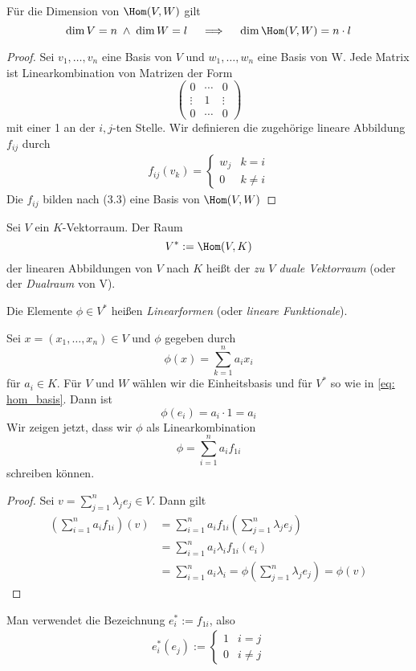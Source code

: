 \documentclass{mycourse}
\begin{document}
Für die Dimension von $\Hom(V,W)$ gilt
\[
	\dim V=n \;\land\; \dim W=l \quad \implies\quad \dim \Hom(V,W)=n\cdot l
\]
\begin{proof}
Sei $v_1,\dotsc,v_n$ eine Basis von $V$ und $w_1,\dotsc,w_n$ eine Basis von W.
Jede Matrix ist Linearkombination von Matrizen der Form 
\[
	\begin{pmatrix}0&\cdots&0\\\vdots&1&\vdots\\0&\cdots&0\end{pmatrix}
\]
mit einer 1 an der $i,j$-ten Stelle.
Wir definieren die zugehörige lineare Abbildung $f_{ij}$ durch
\begin{align}
\label{eq: hom_basis}
f_{ij}(v_k)=\begin{cases}
w_j & k=i\\
0 & k\neq i
\end{cases}
\end{align}
Die $f_{ij}$ bilden nach (3.3) eine Basis von $\Hom(V,W)$
\end{proof}

\begin{df}
\label{df:9.1}
Sei $V$ ein $K$-Vektorraum.
Der Raum 
\[
	V^*:=\Hom(V,K)
\]
der linearen Abbildungen von $V$ nach $K$ heißt der \emph{zu $V$ duale Vektorraum} (oder der \emph{Dualraum} von V).

Die Elemente $\phi\in V^*$ heißen \emph{Linearformen} (oder \emph{lineare Funktionale}).
\begin{ex}
	Sei $x=(x_1,\dotsc,x_n)\in V$ und $\phi$ gegeben durch
	\[
		\phi(x) = \sum_{k=1}^n a_ix_i
	\]
	für $a_i \in K$.
	Für $V$ und $W$ wählen wir die Einheitsbasis und für $V^*$ so wie in \eqref{eq: hom_basis}.
	Dann ist
	\[
	\phi(e_i)=a_i\cdot1=a_i
	\]
Wir zeigen jetzt, dass wir $\phi$ als Linearkombination
\[
	\phi=\sum_{i=1}^na_if_{1i}
\]
schreiben können.
\begin{proof}
Sei $v=\sum_{j=1}^n\lambda_je_j\in V$.
Dann gilt
\begin{align*}
\left(\sum_{i=1}^na_if_{1i}\right)(v)
&=\sum_{i=1}^na_if_{1i}\left(\sum_{j=1}^n\lambda_je_j\right)\\
&=\sum_{i=1}^na_i\lambda_if_{1i}(e_i)\\
&=\sum_{i=1}^na_i\lambda_i= \phi\left(\sum_{j=1}^n \lambda_je_j\right) = \phi(v)
\end{align*}
\end{proof}
Man verwendet die Bezeichnung $e_{i}^*:=f_{1i}$, also
\begin{align*}
e_{i}^*(e_j):=\begin{cases}
1&i=j\\
0&i\neq j
\end{cases}
\end{align*}
\end{ex}
\end{df}
\end{document}

